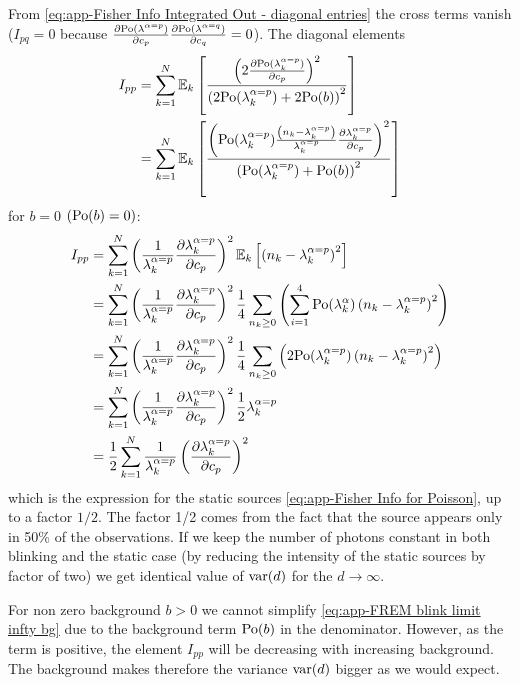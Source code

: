 From \autoref{eq:app-Fisher Info Integrated Out - diagonal entries} the cross terms vanish ($I_{pq}=0$ because $\frac{\partial\mathrm{Po}(\lambda^{\alpha=p})}{\partial c_p}\frac{\partial\mathrm{Po}(\lambda^{\alpha=q})}{\partial c_{q}}=0$). The diagonal elements 
%
\begin{alignat}{3}
	I_{pp} 
	& =\sum_{k=1}^N\mathbb{E}_k\left[\frac{\left(2\frac{\partial\mathrm{Po}(\lambda_k^{\alpha=p})}{\partial c_p}\right)^2}{\left(2\mathrm{Po}(\lambda_k^{\alpha=p})+2\mathrm{Po}(b)\right)^2}\right] \\
 	& =\sum_{k=1}^N\mathbb{E}_k\left[\frac{\left(\mathrm{Po}(\lambda_k^{\alpha=p})\frac{\left(n_k-\lambda_k^{\alpha=p}\right)}{\lambda_k^{\alpha=p}}\frac{\partial\lambda_k^{\alpha=p}}{\partial c_p}\right)^2}{\left(\mathrm{Po}(\lambda_k^{\alpha=p})+\mathrm{Po}(b)\right)^2}\right]\label{eq:app-FREM blink limit infty bg}
\end{alignat}
%
for $b=0$ $\left(\mathrm{Po}(b)=0\right)$:
%
\begin{alignat}{2}
	I_{pp} 
	 &=\sum_{k=1}^N\left(\frac{1}{\lambda_k^{\alpha=p}}\frac{\partial\lambda_k^{\alpha=p}}{\partial c_p}\right)^2\mathbb{E}_k\left[\left(n_k-\lambda_k^{\alpha=p}\right)^2\right]\\
 	& =\sum_{k=1}^N\left(\frac{1}{\lambda_k^{\alpha=p}}\frac{\partial\lambda_k^{\alpha=p}}{\partial c_p}\right)^2\frac{1}{4}\sum_{n_k\geq0}\left(\sum_{i=1}^4\mathrm{Po}(\lambda_k^\alpha)\left(n_k-\lambda_k^{\alpha=p}\right)^2\right)\\
 	& =\sum_{k=1}^N\left(\frac{1}{\lambda_k^{\alpha=p}}\frac{\partial\lambda_k^{\alpha=p}}{\partial c_p}\right)^2\frac{1}{4}\sum_{n_k\geq0}\left(2\mathrm{Po}(\lambda_k^{\alpha=p})\left(n_k-\lambda_k^{\alpha=p}\right)^2\right)\\
 	& =\sum_{k=1}^N\left(\frac{1}{\lambda_k^{\alpha=p}}\frac{\partial\lambda_k^{\alpha=p}}{\partial c_p}\right)^2\frac{1}{2}\lambda_k^{\alpha=p}\\
 	& =\frac{1}{2}\sum_{k=1}^N\frac{1}{\lambda_k^{\alpha=p}}\left(\frac{\partial\lambda_k^{\alpha=p}}{\partial c_p}\right)^2	\label{eq:app-FREM blink lim infty b=0}
\end{alignat}
%
which is the expression for the static sources \autoref{eq:app-Fisher Info for Poisson}, up to a factor $1/2$. The factor 1/2 comes from the fact that the source appears only in 50\% of the observations. If we keep the number of photons constant in both blinking and the static case (by reducing the intensity of the static sources by factor of two) we get identical value of $\mathrm{var}(d)$ for the $d\rightarrow\infty$. 

For non zero background $b>0$ we cannot simplify \autoref{eq:app-FREM blink limit infty bg} due to the background term $\mathrm{Po}(b)$ in the denominator. However, as the term is positive, the element $I_{pp}$ will be decreasing with increasing background. The background makes therefore the variance $\mathrm{var}(d)$ bigger as we would expect.

